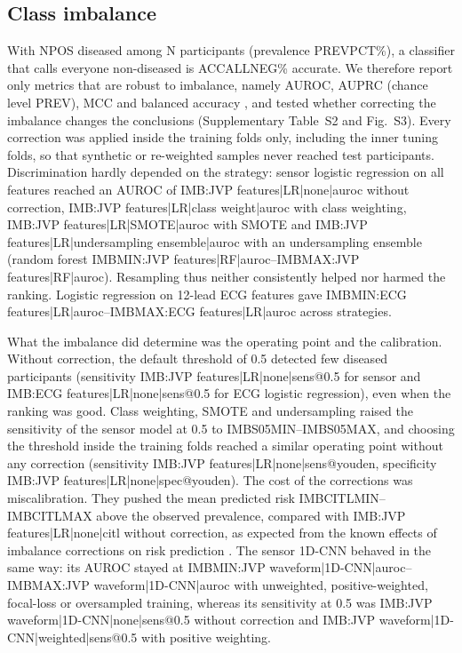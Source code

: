 \documentclass[11pt]{article}
\begin{document}
\subsection*{Class imbalance}
With {{NPOS}} diseased among {{N}} participants (prevalence {{PREVPCT}}\%), a classifier that calls everyone non-diseased is {{ACCALLNEG}}\% accurate. We therefore report only metrics that are robust to imbalance, namely AUROC, AUPRC (chance level {{PREV}}), MCC and balanced accuracy \cite{saito2015precision,chicco2020advantages}, and tested whether correcting the imbalance changes the conclusions (Supplementary Table~S2 and Fig.~S3). Every correction was applied inside the training folds only, including the inner tuning folds, so that synthetic or re-weighted samples never reached test participants. Discrimination hardly depended on the strategy: sensor logistic regression on all features reached an AUROC of {{IMB:JVP features|LR|none|auroc}} without correction, {{IMB:JVP features|LR|class weight|auroc}} with class weighting, {{IMB:JVP features|LR|SMOTE|auroc}} with SMOTE \cite{chawla2002smote} and {{IMB:JVP features|LR|undersampling ensemble|auroc}} with an undersampling ensemble \cite{liu2009exploratory} (random forest {{IMBMIN:JVP features|RF|auroc}}--{{IMBMAX:JVP features|RF|auroc}}). Resampling thus neither consistently helped nor harmed the ranking. Logistic regression on 12-lead ECG features gave {{IMBMIN:ECG features|LR|auroc}}--{{IMBMAX:ECG features|LR|auroc}} across strategies.

What the imbalance did determine was the operating point and the calibration. Without correction, the default threshold of 0.5 detected few diseased participants (sensitivity {{IMB:JVP features|LR|none|sens@0.5}} for sensor and {{IMB:ECG features|LR|none|sens@0.5}} for ECG logistic regression), even when the ranking was good. Class weighting, SMOTE and undersampling raised the sensitivity of the sensor model at 0.5 to {{IMBS05MIN}}--{{IMBS05MAX}}, and choosing the threshold inside the training folds reached a similar operating point without any correction (sensitivity {{IMB:JVP features|LR|none|sens@youden}}, specificity {{IMB:JVP features|LR|none|spec@youden}}). The cost of the corrections was miscalibration. They pushed the mean predicted risk {{IMBCITLMIN}}--{{IMBCITLMAX}} above the observed prevalence, compared with {{IMB:JVP features|LR|none|citl}} without correction, as expected from the known effects of imbalance corrections on risk prediction \cite{vandengoorbergh2022harm}. The sensor 1D-CNN behaved in the same way: its AUROC stayed at {{IMBMIN:JVP waveform|1D-CNN|auroc}}--{{IMBMAX:JVP waveform|1D-CNN|auroc}} with unweighted, positive-weighted, focal-loss \cite{lin2017focal} or oversampled training, whereas its sensitivity at 0.5 was {{IMB:JVP waveform|1D-CNN|none|sens@0.5}} without correction and {{IMB:JVP waveform|1D-CNN|weighted|sens@0.5}} with positive weighting.
\end{document}
